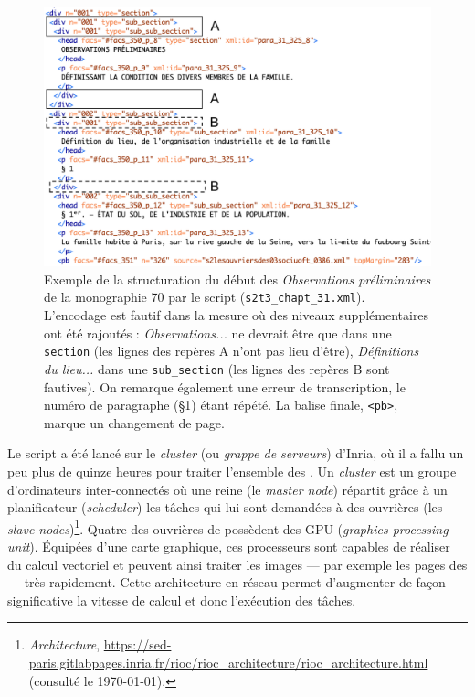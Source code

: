 \begin{figure}[t]
    \centering
    \includegraphics[width=16cm]{img/ex_structure.png}
    \caption[Exemple de la structuration du début de la monographie \no{} 70]{Exemple de la structuration du début des \textit{Observations préliminaires} de la monographie \no{} 70 par le script \lse{} (\texttt{s2t3\_chapt\_31.xml}). L'encodage est fautif dans la mesure où des niveaux supplémentaires ont été rajoutés : \textit{Observations...} ne devrait être que dans une \texttt{section} (les lignes des repères A n'ont pas lieu d'être), \textit{Définitions du lieu...} dans une \texttt{sub\_section} (les lignes des repères B sont fautives). On remarque également une erreur de transcription, le numéro de paragraphe (§1) étant répété. La balise finale, \texttt{<pb>}, marque un changement de page.}
    \label{fig:ex_structure}
\end{figure}

Le script \lse{} a été lancé sur le \textit{cluster} (ou \textit{grappe de serveurs}) \rioc{} d'Inria, où il a fallu un peu plus de quinze heures pour traiter l'ensemble des \odm. Un \textit{cluster} est un groupe d'ordinateurs inter-connectés où une \og reine \fg{} (le \textit{master node}) répartit grâce à un \og planificateur \fg{} (\textit{scheduler}) les tâches qui lui sont demandées à des \og ouvrières \fg{} (les \textit{slave nodes})\footnote{\textit{\rioc{} Architecture}, \url{https://sed-paris.gitlabpages.inria.fr/rioc/rioc_architecture/rioc_architecture.html} (consulté le \today).}. Quatre des \og ouvrières \fg{} de \rioc{} possèdent des GPU (\textit{graphics processing unit}). Équipées d'une carte graphique, ces processeurs sont capables de réaliser du calcul vectoriel et peuvent ainsi traiter les images --- par exemple les pages des \odm{} --- très rapidement. Cette architecture en réseau permet d'augmenter de façon significative la vitesse de calcul et donc l'exécution des tâches.

